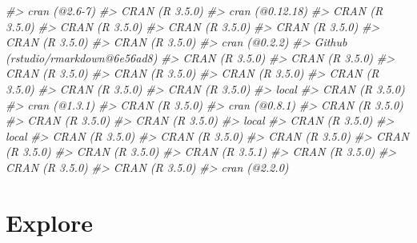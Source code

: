 \documentclass[]{book}
\newenvironment{Shaded}{\begin{snugshade}}{\end{snugshade}}
\newcommand{\CommentTok}[1]{\textcolor[rgb]{0.56,0.35,0.01}{\textit{#1}}}
\theoremstyle{plain}
\theoremstyle{remark}
\begin{document}
\begin{Shaded}
\begin{Highlighting}[]
\CommentTok{#>  cran (@2.6-7)                            }
\CommentTok{#>  CRAN (R 3.5.0)                           }
\CommentTok{#>  cran (@0.12.18)                          }
\CommentTok{#>  CRAN (R 3.5.0)                           }
\CommentTok{#>  CRAN (R 3.5.0)                           }
\CommentTok{#>  CRAN (R 3.5.0)                           }
\CommentTok{#>  CRAN (R 3.5.0)                           }
\CommentTok{#>  CRAN (R 3.5.0)                           }
\CommentTok{#>  CRAN (R 3.5.0)                           }
\CommentTok{#>  cran (@0.2.2)                            }
\CommentTok{#>  Github (rstudio/rmarkdown@6e56ad8)       }
\CommentTok{#>  CRAN (R 3.5.0)                           }
\CommentTok{#>  CRAN (R 3.5.0)                           }
\CommentTok{#>  CRAN (R 3.5.0)                           }
\CommentTok{#>  CRAN (R 3.5.0)                           }
\CommentTok{#>  CRAN (R 3.5.0)                           }
\CommentTok{#>  CRAN (R 3.5.0)                           }
\CommentTok{#>  CRAN (R 3.5.0)                           }
\CommentTok{#>  CRAN (R 3.5.0)                           }
\CommentTok{#>  local                                    }
\CommentTok{#>  CRAN (R 3.5.0)                           }
\CommentTok{#>  cran (@1.3.1)                            }
\CommentTok{#>  CRAN (R 3.5.0)                           }
\CommentTok{#>  cran (@0.8.1)                            }
\CommentTok{#>  CRAN (R 3.5.0)                           }
\CommentTok{#>  CRAN (R 3.5.0)                           }
\CommentTok{#>  CRAN (R 3.5.0)                           }
\CommentTok{#>  local                                    }
\CommentTok{#>  CRAN (R 3.5.0)                           }
\CommentTok{#>  local                                    }
\CommentTok{#>  CRAN (R 3.5.0)                           }
\CommentTok{#>  CRAN (R 3.5.0)                           }
\CommentTok{#>  CRAN (R 3.5.0)                           }
\CommentTok{#>  CRAN (R 3.5.0)                           }
\CommentTok{#>  CRAN (R 3.5.0)                           }
\CommentTok{#>  CRAN (R 3.5.1)                           }
\CommentTok{#>  CRAN (R 3.5.0)                           }
\CommentTok{#>  CRAN (R 3.5.0)                           }
\CommentTok{#>  CRAN (R 3.5.0)                           }
\CommentTok{#>  cran (@2.2.0)}
\end{Highlighting}
\end{Shaded}

\hypertarget{part-explore}{%
\part{Explore}\label{part-explore}}
\end{document}
